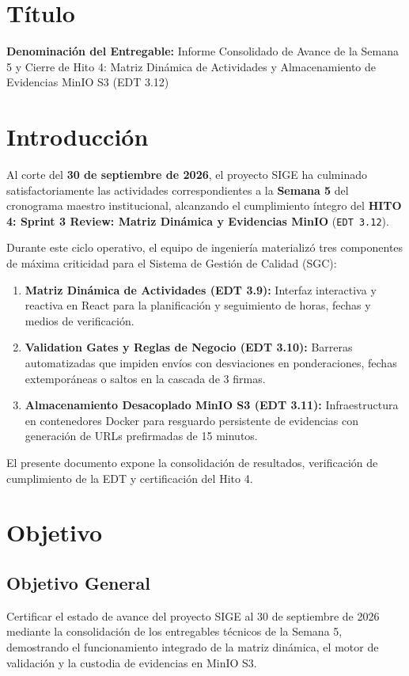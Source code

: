 \documentclass[12pt,a4paper]{article}
\begin{document}
\section{Título}
\textbf{Denominación del Entregable:} Informe Consolidado de Avance de la Semana 5 y Cierre de Hito 4: Matriz Dinámica de Actividades y Almacenamiento de Evidencias MinIO S3 (EDT 3.12)

\section{Introducción}
Al corte del \textbf{30 de septiembre de 2026}, el proyecto SIGE ha culminado satisfactoriamente las actividades correspondientes a la \textbf{Semana 5} del cronograma maestro institucional, alcanzando el cumplimiento íntegro del \textbf{HITO 4: Sprint 3 Review: Matriz Dinámica y Evidencias MinIO} (\texttt{EDT 3.12}).

Durante este ciclo operativo, el equipo de ingeniería materializó tres componentes de máxima criticidad para el Sistema de Gestión de Calidad (SGC):
\begin{enumerate}[leftmargin=1.5em, itemsep=2pt]
    \item \textbf{Matriz Dinámica de Actividades (EDT 3.9):} Interfaz interactiva y reactiva en React para la planificación y seguimiento de horas, fechas y medios de verificación.
    \item \textbf{Validation Gates y Reglas de Negocio (EDT 3.10):} Barreras automatizadas que impiden envíos con desviaciones en ponderaciones, fechas extemporáneas o saltos en la cascada de 3 firmas.
    \item \textbf{Almacenamiento Desacoplado MinIO S3 (EDT 3.11):} Infraestructura en contenedores Docker para resguardo persistente de evidencias con generación de URLs prefirmadas de 15 minutos.
\end{enumerate}

El presente documento expone la consolidación de resultados, verificación de cumplimiento de la EDT y certificación del Hito 4.

\section{Objetivo}

\subsection{Objetivo General}
Certificar el estado de avance del proyecto SIGE al 30 de septiembre de 2026 mediante la consolidación de los entregables técnicos de la Semana 5, demostrando el funcionamiento integrado de la matriz dinámica, el motor de validación y la custodia de evidencias en MinIO S3.
\end{document}
